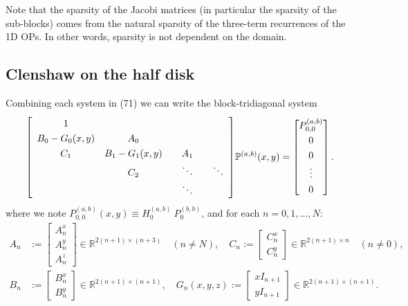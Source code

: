 \documentclass[11pt, oneside]{article}   	%
\newcommand{\R}{\mathbb{R}}
\newcommand{\bigP}{\mathbb{P}}
\newcommand{\bigPab}{\bigP^{(a,b)}}
\begin{document}
Note that the sparsity of the Jacobi matrices (in particular the sparsity of the sub-blocks) comes from the natural sparsity of the three-term recurrences of the 1D OPs. In other words, sparsity is not dependent on the domain.

\subsection{Clenshaw on the half disk}

Combining each system in (71) we can write the block-tridiagonal system
\begin{align}
\renewcommand\arraystretch{1.3}
\mleft[
\begin{array}{cccc}
		1 & & & \\
		B_0-G_0(x,y) & A_0 & & \\
		C_1 & B_1-G_1(x,y) & \quad A_1 \quad & \\
		& C_2 & \ddots & \ddots \\
		& & \ddots &
\end{array}
\mright]
\bigPab(x,y)
=
\begin{bmatrix}
	P^{(a,b)}_{0,0} \\ 0 \\ 0 \\ \vdots \\ 0 \\
\end{bmatrix}.
\end{align}
where we note \(P^{(a,b)}_{0,0}(x,y) \equiv H_0^{(a,b)} \: P_0^{(b,b)}\), and for each \(n = 0,1,\dots,N\):
\begin{align}
A_n &:= \begin{bmatrix}
		A^x_n \\
		A^y_n \\
		A^z_n
	    \end{bmatrix} \in \R^{2(n+1)\times(n+3)} \quad (n \ne N), \quad
C_n := \begin{bmatrix}
		C^x_n \\
		C^y_n
	    \end{bmatrix} \in \R^{2(n+1)\times n} \quad (n \ne 0), \nonumber \\
B_n &:= \begin{bmatrix}
		B^x_n \\
		B^y_n
	    \end{bmatrix} \in \R^{2(n+1)\times(n+1)}, \quad
G_n(x,y,z) := \begin{bmatrix}
		xI_{n+1} \\
		yI_{n+1}
	    \end{bmatrix} \in \R^{2(n+1)\times(n+1)}.
\end{align}
 
\end{document}
